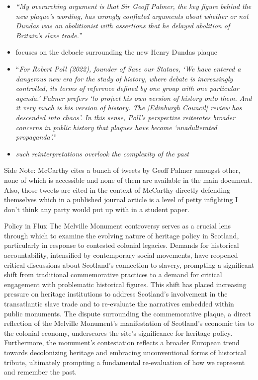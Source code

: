 \documentclass{scrartcl}
\begin{document}
\begin{itemize}
    \item \textit{``My overarching argument is that Sir Geoff Palmer, the key figure behind the new plaque’s wording, has wrongly conflated arguments about whether or not Dundas was an abolitionist with assertions that he delayed abolition of Britain’s slave trade.''}
    \item focuses on the debacle surrounding the new Henry Dundas plaque
    \item ``\textit{For Robert Poll (2022), founder of Save our Statues, ‘We have entered a dangerous new era for the study of history, where debate is increasingly controlled, its terms of reference defined by one group with one particular agenda.’ }\textit{Palmer prefers ‘to project his own version of history onto them. And it very much is his version of history. The [Edinburgh Council] review has descended into chaos’. In this sense, Poll’s perspective reiterates broader concerns in public history that plaques have become ‘unadulterated propaganda’.}''
    \item \textit{such reinterpretations overlook the complexity of the past}
\end{itemize}

Side Note: McCarthy cites a bunch of tweets by Geoff Palmer amongst other, none of which is accessible and none of them are available in the main document. Also, those tweets are cited in the context of McCarthy directly defending themselves which in a published journal article is a level of petty infighting I don't think any party would put up with in a student paper.

Policy in Flux
The Melville Monument controversy serves as a crucial lens through which to examine the evolving nature of heritage policy in Scotland, particularly in response to contested colonial legacies. Demands for historical accountability, intensified by contemporary social movements, have reopened critical discussions about Scotland's connection to slavery, prompting a significant shift from traditional commemorative practices to a demand for critical engagement with problematic historical figures. This shift has placed increasing pressure on heritage institutions to address Scotland's involvement in the transatlantic slave trade and to re-evaluate the narratives embedded within public monuments. The dispute surrounding the commemorative plaque, a direct reflection of the Melville Monument's manifestation of Scotland's economic ties to the colonial economy, underscores the site's significance for heritage policy. Furthermore, the monument's contestation reflects a broader European trend towards decolonizing heritage and embracing unconventional forms of historical tribute, ultimately prompting a fundamental re-evaluation of how we represent and remember the past.
\end{document}
